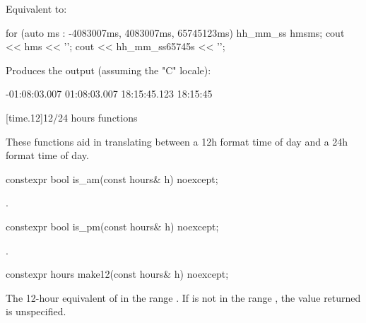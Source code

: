 \begin{itemdescr}
\pnum
\effects
Equivalent to:

\pnum
\begin{example}
\begin{codeblock}
for (auto ms : {-4083007ms, 4083007ms, 65745123ms}) {
  hh_mm_ss hms{ms};
  cout << hms << '\n';
}
cout << hh_mm_ss{65745s} << '\n';
\end{codeblock}
Produces the output (assuming the "C" locale):
\begin{codeblock}
-01:08:03.007
01:08:03.007
18:15:45.123
18:15:45
\end{codeblock}
\end{example}
\end{itemdescr}

[time.12]{12/24 hours functions}

\pnum
These functions aid in translating between a 12h format time of day
and a 24h format time of day.

%
\begin{itemdecl}
constexpr bool is_am(const hours& h) noexcept;
\end{itemdecl}

\begin{itemdescr}
\pnum
\returns
{}.
\end{itemdescr}

%
\begin{itemdecl}
constexpr bool is_pm(const hours& h) noexcept;
\end{itemdecl}

\begin{itemdescr}
\pnum
\returns
{}.
\end{itemdescr}

%
\begin{itemdecl}
constexpr hours make12(const hours& h) noexcept;
\end{itemdecl}

\begin{itemdescr}
\pnum
\returns
The 12-hour equivalent of  in the range .
If  is not in the range ,
the value returned is unspecified.
\end{itemdescr}

